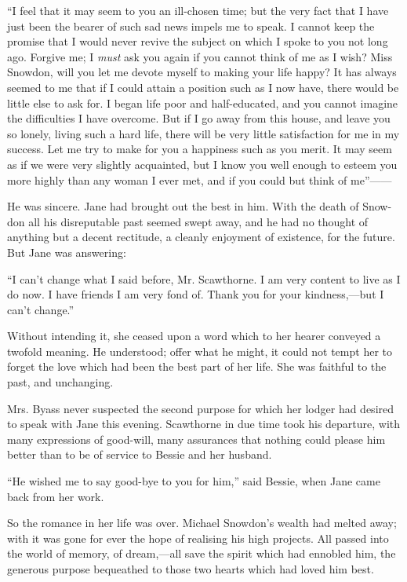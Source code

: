 ``I feel that it may seem to you an ill-chosen time; but the very fact
that I have just been the bearer of such sad news impels me to speak. I
cannot keep the promise that I would never revive the subject on which I
spoke to you not long ago. Forgive me; I \emph{must} ask you again if
you cannot think of me as I wish? Miss Snowdon, will you let me devote
myself to making your life happy? It has always seemed to me that if I
could attain a position such as I now have, there would be little else
to ask for. I began life poor and half-educated, and you cannot imagine
the difficulties I have overcome. But if I go away from this house, and
leave you so lonely, living such a hard life, there will be very
{}little satisfaction for me in my success. Let me try to make for you a
happiness such as you merit. It may seem as if we were very slightly
acquainted, but I know you well enough to esteem you more highly than
any woman I ever met, and if you could but think of {me''{{------}}}

He was sincere. Jane had brought out the best in him. With the death of
Snow- don all his disreputable past seemed swept away, and he had no
thought of anything but a decent rectitude, a cleanly enjoyment of
existence, for the future. But Jane was answering:

``I can't change what I said before, Mr. Scawthorne. I am very content
to live as I do now. I have friends I am very fond of. Thank you for
your kindness,---but I can't change.''

Without intending it, she ceased upon a word which to her hearer
conveyed a twofold meaning. He understood; offer what he might, it could
not tempt her to forget the love which had been the best part of her
life. She was faithful to the past, and unchanging.

Mrs. Byass never suspected the second purpose for which her lodger had
desired to speak {}with Jane this evening. Scawthorne in due time took
his departure, with many expressions of good-will, many assurances that
nothing could please him better than to be of service to Bessie and her
husband.

``He wished me to say good-bye to you for him,'' said Bessie, when Jane
came back from her work.

So the romance in her life was over. Michael Snowdon's wealth had melted
away; with it was gone for ever the hope of realising his high projects.
All passed into the world of memory, of dream,---all save the spirit
which had ennobled him, the generous purpose bequeathed to those two
hearts which had loved him best.

